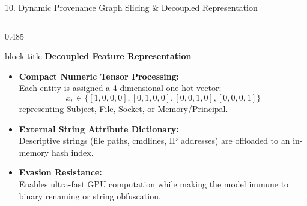 \documentclass[aspectratio=169,10pt]{beamer}
\begin{document}
\begin{frame}{10. Dynamic Provenance Graph Slicing \& Decoupled Representation}
\begin{columns}[T]
\begin{column}{0.485\textwidth}
\begin{beamercolorbox}[rounded=true,shadow=false,sep=0.30em,wd=\linewidth]{block title}
\textbf{\scriptsize Decoupled Feature Representation}
\end{beamercolorbox}
\vspace{0.12em}
{\fontsize{7.0pt}{9.8pt}\selectfont
\begin{itemize}\itemsep0.22em
  \item \textbf{Compact Numeric Tensor Processing:}\\
  Each entity is assigned a 4-dimensional one-hot vector:
  \[
  x_v \in \{[1,0,0,0], [0,1,0,0], [0,0,1,0], [0,0,0,1]\}
  \]
  representing Subject, File, Socket, or Memory/Principal.
  \item \textbf{External String Attribute Dictionary:}\\
  Descriptive strings (file paths, cmdlines, IP addresses) are offloaded to an in-memory hash index.
  \item \textbf{Evasion Resistance:}\\
  Enables ultra-fast GPU computation while making the model immune to binary renaming or string obfuscation.
\end{itemize}
}
\end{column}
\end{columns}
\end{frame}
\end{document}
